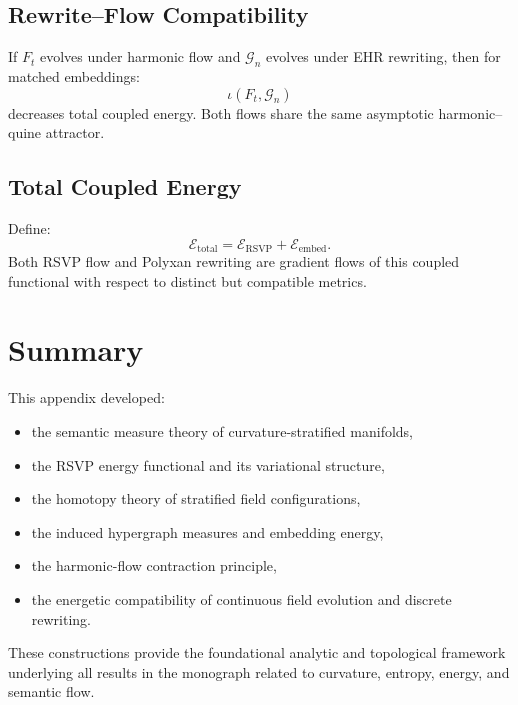 \subsection{Rewrite–Flow Compatibility}

If $F_t$ evolves under harmonic flow and $\mathcal{G}_n$ evolves under EHR rewriting, then for matched embeddings:
\[
\iota(F_t,\mathcal{G}_n)
\]
decreases total coupled energy. Both flows share the same asymptotic harmonic–quine attractor.

\subsection{Total Coupled Energy}

Define:
\[
\mathcal{E}_{\mathrm{total}}
=
\mathcal{E}_{\mathrm{RSVP}}
+
\mathcal{E}_{\mathrm{embed}}.
\]
Both RSVP flow and Polyxan rewriting are gradient flows of this coupled functional with respect to distinct but compatible metrics.

\section{Summary}

This appendix developed:
\begin{itemize}
\item the semantic measure theory of curvature-stratified manifolds,
\item the RSVP energy functional and its variational structure,
\item the homotopy theory of stratified field configurations,
\item the induced hypergraph measures and embedding energy,
\item the harmonic-flow contraction principle,
\item the energetic compatibility of continuous field evolution and discrete rewriting.
\end{itemize}

These constructions provide the foundational analytic and topological framework underlying all results in the monograph related to curvature, entropy, energy, and semantic flow.

